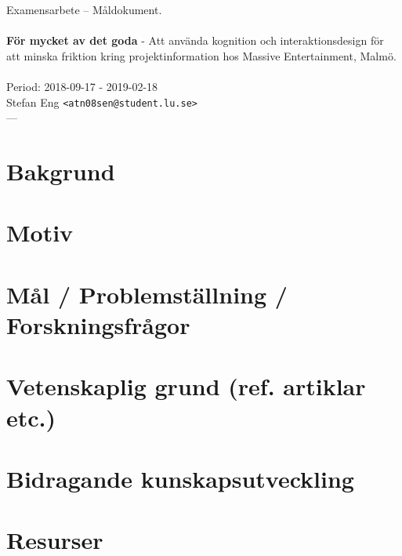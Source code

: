 \documentclass{article}
\begin{document}
\begin{center}

  Examensarbete -- Måldokument. \\
  \ \\
  {\large
    \textbf{För mycket av det goda} -
    Att använda kognition och interaktionsdesign för
    att minska friktion kring projektinformation hos Massive
    Entertainment, Malmö. \\
  }
  \ \\
  Period: 2018-09-17 - 2019-02-18\\
  Stefan Eng \texttt{<atn08sen@student.lu.se>}
  \ \\
  ---
  \vspace{-0.3cm}

\end{center}

\section*{Bakgrund}

\section*{Motiv}

\section*{Mål / Problemställning / Forskningsfrågor}

\section*{Vetenskaplig grund (ref. artiklar etc.)}

\section*{Bidragande kunskapsutveckling}

\section*{Resurser}
\end{document}
